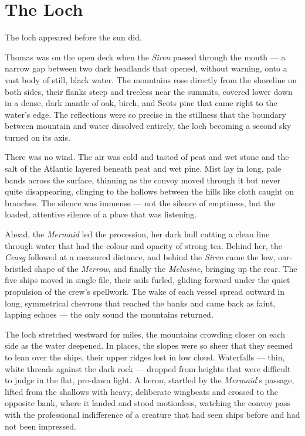 
\chapter{The Loch}

The loch appeared before the sun did.

Thomas was on the open deck when the \textit{Siren} passed through the mouth --- a narrow gap between two dark headlands that opened, without warning, onto a vast body of still, black water. The mountains rose directly from the shoreline on both sides, their flanks steep and treeless near the summits, covered lower down in a dense, dark mantle of oak, birch, and Scots pine that came right to the water's edge. The reflections were so precise in the stillness that the boundary between mountain and water dissolved entirely, the loch becoming a second sky turned on its axis.

There was no wind. The air was cold and tasted of peat and wet stone and the salt of the Atlantic layered beneath peat and wet pine. Mist lay in long, pale bands across the surface, thinning as the convoy moved through it but never quite disappearing, clinging to the hollows between the hills like cloth caught on branches. The silence was immense --- not the silence of emptiness, but the loaded, attentive silence of a place that was listening.

Ahead, the \textit{Mermaid} led the procession, her dark hull cutting a clean line through water that had the colour and opacity of strong tea. Behind her, the \textit{Ceasg} followed at a measured distance, and behind the \textit{Siren} came the low, oar-bristled shape of the \textit{Merrow}, and finally the \textit{Melusine}, bringing up the rear. The five ships moved in single file, their sails furled, gliding forward under the quiet propulsion of the crew's spellwork. The wake of each vessel spread outward in long, symmetrical chevrons that reached the banks and came back as faint, lapping echoes --- the only sound the mountains returned.

The loch stretched westward for miles, the mountains crowding closer on each side as the water deepened. In places, the slopes were so sheer that they seemed to lean over the ships, their upper ridges lost in low cloud. Waterfalls --- thin, white threads against the dark rock --- dropped from heights that were difficult to judge in the flat, pre-dawn light. A heron, startled by the \textit{Mermaid}'s passage, lifted from the shallows with heavy, deliberate wingbeats and crossed to the opposite bank, where it landed and stood motionless, watching the convoy pass with the professional indifference of a creature that had seen ships before and had not been impressed.


